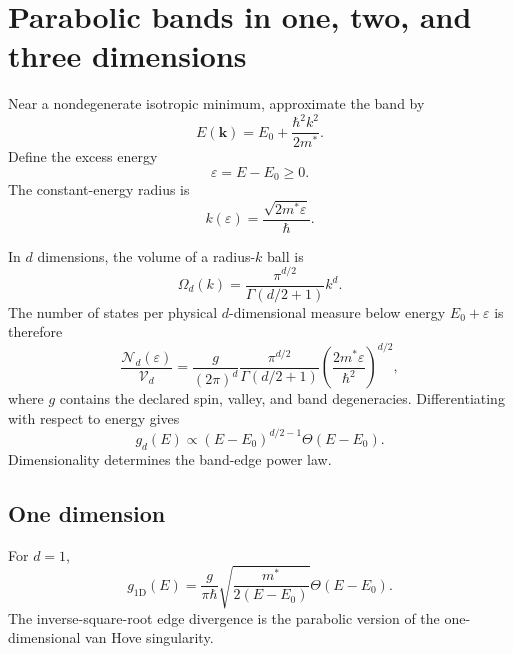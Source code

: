 \section{Parabolic bands in one, two, and three dimensions}

Near a nondegenerate isotropic minimum, approximate the band by
\begin{equation}
  E(\bm k)=E_0+\frac{\hbar^2k^2}{2m^*}.
  \label{eq:dos-isotropic-parabolic-band}
\end{equation}
Define the excess energy
\begin{equation}
  \varepsilon=E-E_0\ge0.
  \label{eq:dos-parabolic-excess-energy}
\end{equation}
The constant-energy radius is
\begin{equation}
  k(\varepsilon)=\frac{\sqrt{2m^*\varepsilon}}{\hbar}.
  \label{eq:dos-parabolic-k-radius}
\end{equation}

In $d$ dimensions, the volume of a radius-$k$ ball is
\begin{equation}
  \Omega_d(k)
  =\frac{\pi^{d/2}}{\Gamma(d/2+1)}k^d.
  \label{eq:d-dimensional-ball-volume}
\end{equation}
The number of states per physical $d$-dimensional measure below energy
$E_0+\varepsilon$ is therefore
\begin{equation}
  \frac{\mathcal N_d(\varepsilon)}{\mathcal V_d}
  =\frac{g}{(2\pi)^d}
   \frac{\pi^{d/2}}{\Gamma(d/2+1)}
   \left(\frac{2m^*\varepsilon}{\hbar^2}\right)^{d/2},
  \label{eq:integrated-parabolic-state-count-d-dimensions}
\end{equation}
where $g$ contains the declared spin, valley, and band degeneracies.
Differentiating with respect to energy gives
\begin{equation}
  g_d(E)\propto(E-E_0)^{d/2-1}\Theta(E-E_0).
  \label{eq:dos-dimensional-power-law}
\end{equation}
Dimensionality determines the band-edge power law.

\subsection{One dimension}

For $d=1$,
\begin{equation}
  \boxed{
  g_{1\mathrm D}(E)
  =\frac{g}{\pi\hbar}
   \sqrt{\frac{m^*}{2(E-E_0)}}
   \Theta(E-E_0).
  }
  \label{eq:one-dimensional-parabolic-dos}
\end{equation}
The inverse-square-root edge divergence is the parabolic version of the
one-dimensional van Hove singularity.

